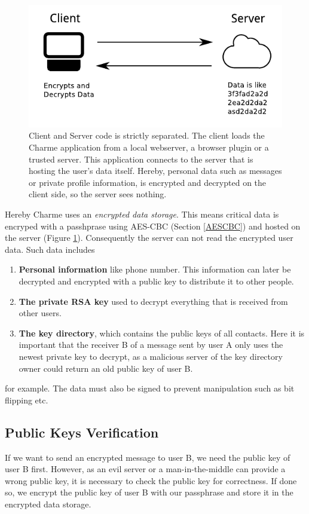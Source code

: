 \documentclass{scrartcl}
\begin{document}
\begin{figure}[ht]
	\centering
  \includegraphics[]{eds.pdf}
	\caption{Client and Server code is strictly separated. The client loads the Charme application from a local webserver, a browser plugin or a trusted server. This application connects to the server that is hosting the user's data itself. Hereby, personal data such as messages or private profile information, is encrypted and decrypted on the client side, so the server sees nothing.}
	\label{fig1}
\end{figure}


Hereby Charme uses an \textit{encrypted data storage}. This means critical data is encryped with a passhprase using AES-CBC (Section \ref{AESCBC}) and hosted on the server  (Figure \ref{fig1}). Consequently the server can not read the encrypted user data. Such data includes
\begin{enumerate}
\item \textbf{Personal information} like phone number. This information can later be decrypted and encrypted with a public key to distribute it to other people.
\item \textbf{The private RSA key} used to decrypt everything that is received from other users.
\item \textbf{The key directory}, which contains the public keys of all contacts. Here it is important that the receiver B of a message sent by user A only uses the newest private key to decrypt, as a malicious server of the key directory owner could return an old public key of user B.
\end{enumerate}
for example. The data must also be signed to prevent manipulation such as bit flipping etc.

\subsection{Public Keys Verification}
If we want to send an encrypted message to user B, we need the public key of user B first. However, as an evil server or a man-in-the-middle can provide a wrong public key, it is necessary to check the public key for correctness. If done so, we encrypt the public key of user B with our passphrase and store it in the encrypted data storage.
 
\end{document}
